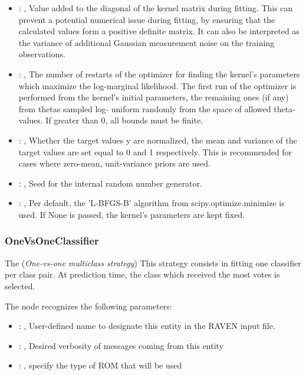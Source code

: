 \begin{itemize}
    \item {}: , 
      Value added to the diagonal of the kernel matrix during fitting. This can prevent a potential
      numerical issue during fitting, by ensuring that the calculated
      values form a positive definite matrix. It can also be interpreted as the variance of
      additional Gaussian measurement noise on the training observations.

    \item {}: , 
      The number of restarts of the optimizer for finding the kernel's parameters which maximize the
      log-marginal likelihood. The first run of the optimizer is performed
      from the kernel's initial parameters, the remaining ones (if any) from thetas sampled log-
      uniform randomly from the space of allowed theta-values. If greater than
      0, all bounds must be finite.

    \item {}: , 
      Whether the target values y are normalized, the mean and variance of the target values are set
      equal to 0 and 1 respectively. This is recommended for cases where zero-mean,
      unit-variance priors are used.

    \item {}: , 
      Seed for the internal random number generator.

    \item {}: , 
      Per default, the 'L-BFGS-B' algorithm from
      scipy.optimize.minimize is used. If None is passed, the kernel’s
      parameters are kept fixed.
  \end{itemize}


\subsubsection{OneVsOneClassifier}
  The  (\textit{One-vs-one multiclass strategy})
  This strategy consists in fitting one classifier per class pair. At prediction time, the class
  which received the most votes is selected.

  The  node recognizes the following parameters:
    \begin{itemize}
      \item {}: , 
        User-defined name to designate this entity in the RAVEN input file.
      \item {}: , 
        Desired verbosity of messages coming from this entity
      \item {}: , 
        specify the type of ROM that will be used
  \end{itemize}

